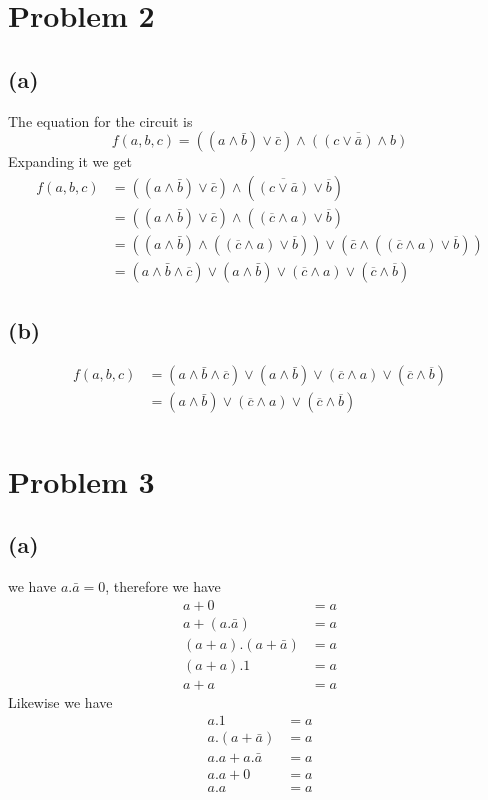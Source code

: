\documentclass[12pt]{article}
\begin{document}
\section*{Problem 2}
\subsection*{(a)}
The equation for the circuit is 
$$f(a,b,c)=((a\wedge \bar{b})\vee\bar{c})\wedge\overline{((c\vee\bar{a})\wedge b)}$$
Expanding it we get
\begin{align*}
    f(a,b,c)&=((a\wedge \bar{b})\vee\bar{c})\wedge(\overline{(c\vee\bar{a})}\vee \overline{b})\\
    &=((a\wedge \bar{b})\vee\bar{c})\wedge((\overline{c}\wedge a)\vee \overline{b})\\
    &=((a\wedge \bar{b})\wedge((\overline{c}\wedge a)\vee \overline{b}))\vee(\bar{c}\wedge((\overline{c}\wedge a)\vee \overline{b}))\\
    &=\boxed{(a\wedge \bar{b}\wedge\overline{c})\vee(a\wedge \bar{b})\vee(\overline{c}\wedge a)\vee (\overline{c}\wedge\overline{b})}
\end{align*}
\subsection*{(b)}
\begin{align*}
    f(a,b,c)&=(a\wedge \bar{b}\wedge\overline{c})\vee(a\wedge \bar{b})\vee(\overline{c}\wedge a)\vee (\overline{c}\wedge\overline{b})\\
    &=\boxed{(a\wedge \bar{b})\vee(\overline{c}\wedge a)\vee (\overline{c}\wedge\overline{b})}\\
\end{align*}
\section*{Problem 3}
\subsection*{(a)}
we have $a.\bar{a}=0$, therefore we have
\begin{align*}
    a+0&=a\\
    a+(a.\bar{a})&=a\\
    (a+a).(a+\bar{a})&=a\\
    (a+a).1&=a\\
    a+a&=a
\end{align*}
Likewise we have
\begin{align*}
    a.1&=a\\
    a.(a+\bar{a})&=a\\
    a.a+a.\bar{a}&=a\\
    a.a+0&=a\\
    a.a&=a
\end{align*}
\end{document}
